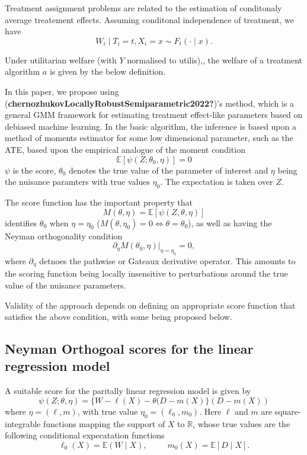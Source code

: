 \documentclass[
]{article}
\begin{document}
Treatment assignment problems are related to the estimation of
conditonaly average treatement effects. Assuming conditonal independence
of treatment, we have \[
W_{i} \mid T_{i}=t, X_{i}=x \sim F_{t}(\cdot\mid x).
\]

Under utilitarian welfare (with \(Y\) normalised to utilis),, the
welfare of a treatment algorithm \(a\) is given by the below definition.

In this paper, we propose using
(\textbf{chernozhukovLocallyRobustSemiparametric2022?})'s method, which
is a general GMM framework for estimating treatment effect-like
parameters based on debiased machine learning. In the basic algorithm,
the inference is based upon a method of moments estimator for some low
dimensional parameter, such as the ATE, based upon the empirical
analogue of the moment condition \[
\mathbb{E}[\psi(Z; \theta_{0}, \eta)] =0
\] \(\psi\) is the score, \(\theta_{0}\) denotes the true value of the
parameter of interest and \(\eta\) being the nuisance paramters with
true values \(\eta_{0}\). The expectation is taken over \(Z\).

The score function has the important property that \[
M(\theta, \eta) = \mathbb{E}[\psi(Z, \theta, \eta)]
\] identifies \(\theta_{0}\) when \(\eta=\eta_{0}\)
(\(M(\theta, \eta_{0}) =0 \iff \theta=\theta_{0}\)), as well as having
the Neyman orthogonality condition \[
\partial_{\eta}M(\theta_{0}, \eta) \bigg|_{\eta=\eta_{0}} =0,
\] where \(\partial_{\eta}\) detnoes the pathwise or Gateaux derivative
operator. This amounts to the scoring function being locally insensitive
to perturbations around the true value of the nuisance parameters.

Validity of the approach depends on defining an appropriate score
function that satisfies the above condition, with some being proposed
below.

\subsection{Neyman Orthogoal scores for the linear regression
model}\label{neyman-orthogoal-scores-for-the-linear-regression-model}

A suitable score for the paritally linear regression model is given by
\[
\psi (Z; \theta, \eta) = \{ W - \ell(X) - \theta(D - m(X) \}(D - m(X))
\] where \(\eta = (\ell, m)\), with true value
\(\eta_{0} = (\ell_{0}, m_{0})\). Here \(\ell\) and \(m\) are
square-integrable functions mapping the support of \(X\) to
\(\mathbb{R}\), whose true values are the following conditional
expecatation functions \[
\ell_{0}(X) = \mathbb{E}(W \mid X), ~ ~ ~ ~ ~ ~ ~ ~ ~ ~ ~ m_{0}(X) = \mathbb{E}[D \mid X].
\]
\end{document}
